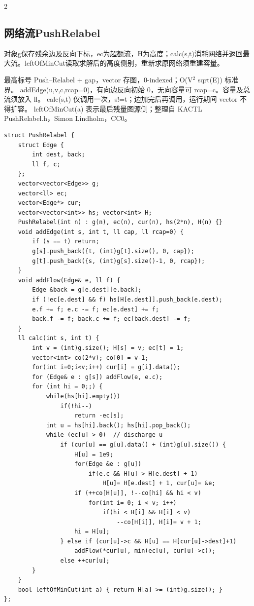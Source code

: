\documentclass[UTF8,fontset=fandol,a4paper,twoside]{ctexart}
\newcommand{\note}[1]{{\fontsize{10}{12}\selectfont #1\par}}
\begin{document}
\begin{multicols}{2}
\subsection{网络流PushRelabel}

\note{对象g保存残余边及反向下标，ec为超额流，H为高度；calc(\allowbreak{}s,\allowbreak{}t)\allowbreak{}消耗网络并返回最大流。leftOfMinCut读取求解后的高度侧别，重新求原网络须重建容量。}
\note{最高标号 Push–Relabel +\allowbreak{} gap，vector 存图，0-\allowbreak{}indexed；O(\allowbreak{}V\ensuremath{^2} sqrt(\allowbreak{}E)\allowbreak{})\allowbreak{} 标准界。 addEdge(\allowbreak{}u,\allowbreak{}v,\allowbreak{}c,\allowbreak{}rcap=\allowbreak{}0)\allowbreak{}，有向边反向初始 0，无向容量可 rcap=\allowbreak{}c。容量及总流须放入 ll。 calc(\allowbreak{}s,\allowbreak{}t)\allowbreak{} 仅调用一次，s!=\allowbreak{}t；边加完后再调用，运行期间 vector 不得扩容。 leftOfMinCut(\allowbreak{}a)\allowbreak{} 表示最后残量图源侧；整理自 KACTL PushRelabel.\allowbreak{}h，Simon Lindholm，CC0。}
\begin{lstlisting}
struct PushRelabel {
    struct Edge {
        int dest, back;
        ll f, c;
    };
    vector<vector<Edge>> g;
    vector<ll> ec;
    vector<Edge*> cur;
    vector<vector<int>> hs; vector<int> H;
    PushRelabel(int n) : g(n), ec(n), cur(n), hs(2*n), H(n) {}
    void addEdge(int s, int t, ll cap, ll rcap=0) {
        if (s == t) return;
        g[s].push_back({t, (int)g[t].size(), 0, cap});
        g[t].push_back({s, (int)g[s].size()-1, 0, rcap});
    }
    void addFlow(Edge& e, ll f) {
        Edge &back = g[e.dest][e.back];
        if (!ec[e.dest] && f) hs[H[e.dest]].push_back(e.dest);
        e.f += f; e.c -= f; ec[e.dest] += f;
        back.f -= f; back.c += f; ec[back.dest] -= f;
    }
    ll calc(int s, int t) {
        int v = (int)g.size(); H[s] = v; ec[t] = 1;
        vector<int> co(2*v); co[0] = v-1;
        for(int i=0;i<v;i++) cur[i] = g[i].data();
        for (Edge& e : g[s]) addFlow(e, e.c);
        for (int hi = 0;;) {
            while(hs[hi].empty())
                if(!hi--)
                    return -ec[s];
            int u = hs[hi].back(); hs[hi].pop_back();
            while (ec[u] > 0)  // discharge u
                if (cur[u] == g[u].data() + (int)g[u].size()) {
                    H[u] = 1e9;
                    for(Edge &e : g[u])
                        if(e.c && H[u] > H[e.dest] + 1)
                            H[u]= H[e.dest] + 1, cur[u]= &e;
                    if (++co[H[u]], !--co[hi] && hi < v)
                        for(int i= 0; i < v; i++)
                            if(hi < H[i] && H[i] < v)
                                --co[H[i]], H[i]= v + 1;
                    hi = H[u];
                } else if (cur[u]->c && H[u] == H[cur[u]->dest]+1)
                    addFlow(*cur[u], min(ec[u], cur[u]->c));
                else ++cur[u];
        }
    }
    bool leftOfMinCut(int a) { return H[a] >= (int)g.size(); }
};
\end{lstlisting}

\end{multicols}
\end{document}
